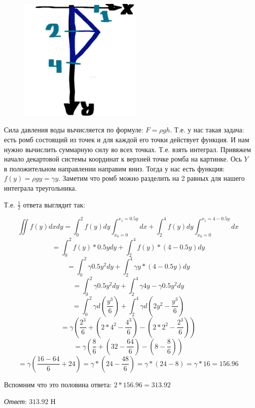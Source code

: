 \begin{minipage}{\linewidth}

    \begin{figure}
        \includegraphics[height=60mm]{images/1a2}
    \end{figure}

    Сила давления воды вычисляется по формуле: $F = \rho g h$. Т.е. у нас такая задача: есть ромб состоящий из точек и для каждой его точки
    действует функция. И нам нужно вычислить суммарную силу во всех точках. Т.е. взять интеграл. Привяжем начало декартовой системы координат к верхней точке ромба на картинке.
    Ось $Y$ в положительном направлении направим вниз. Тогда у нас есть функция: $f(y) = \rho g y = \gamma y$. Заметим что ромб можно разделить на 2 равных для нашего интеграла треугольника.

\end{minipage}

\vspace{14mm}

Т.е. $\frac{1}{2}$ ответа выглядит так:

\[\iint{f(y)}dxdy = \int_{0}^{2} f(y) dy \int_{x_0 = 0}^{x_1 = 0.5y} dx +
\int_{2}^{4} f(y) dy \int_{x_0 = 0}^{x_1 = 4-0.5y} dx\]
\[ = \int_{0}^{2} f(y)*0.5y dy + \int_{2}^{4} f(y) * (4-0.5y) dy\]
\[ = \int_{0}^{2} \gamma 0.5y^2 dy + \int_{2}^{4} \gamma y * (4 - 0.5y) dy\]
\[ = \int_{0}^{2} \gamma 0.5y^2 dy + \int_{2}^{4} \gamma 4 y - \gamma 0.5y^2 dy\]
\[ = \int_{0}^{2} \gamma d\left(\frac{y^3}{6}\right)  + \int_{2}^{4} \gamma d\left( 2 y^2 - \frac{y^3}{6} \right)\]
\[ = \gamma \left(\frac{2^3}{6} + \left( 2* 4^2 - \frac{4^3}{6} \right) - \left( 2* 2^2 - \frac{2^3}{6} \right) \right)\]
\[ = \gamma \left(\frac{8}{6} + \left( 32 - \frac{64}{6} \right) - \left( 8 - \frac{8}{6} \right) \right)\]
\[ = \gamma \left(\frac{16-64}{6} + 24 \right) = \gamma *\left( 24 - \frac{48}{6}\right) =  \gamma * (24 - 8) =  \gamma * 16 = 156.96\]

Вспомним что это половина ответа: $2 * 156.96 = 313.92$

\textit{Ответ}: $313.92$ Н
\clearpage
